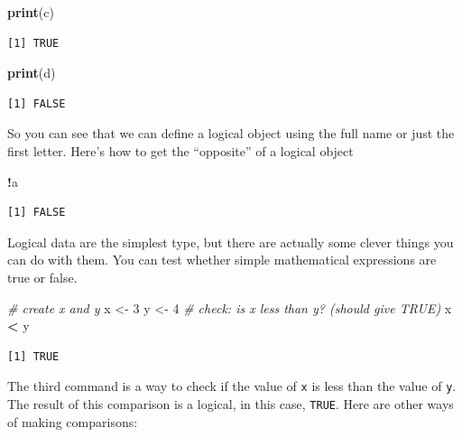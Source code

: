 \documentclass[
]{article}
\newenvironment{Shaded}{\begin{snugshade}}{\end{snugshade}}
\newcommand{\CommentTok}[1]{\textcolor[rgb]{0.56,0.35,0.01}{\textit{#1}}}
\newcommand{\DecValTok}[1]{\textcolor[rgb]{0.00,0.00,0.81}{#1}}
\newcommand{\KeywordTok}[1]{\textcolor[rgb]{0.13,0.29,0.53}{\textbf{#1}}}
\newcommand{\NormalTok}[1]{#1}
\newcommand{\OperatorTok}[1]{\textcolor[rgb]{0.81,0.36,0.00}{\textbf{#1}}}
\newcommand{\StringTok}[1]{\textcolor[rgb]{0.31,0.60,0.02}{#1}}
\begin{document}
\begin{Shaded}
\begin{Highlighting}[]
\KeywordTok{print}\NormalTok{(c)}
\end{Highlighting}
\end{Shaded}

\begin{verbatim}
[1] TRUE
\end{verbatim}

\begin{Shaded}
\begin{Highlighting}[]
\KeywordTok{print}\NormalTok{(d)}
\end{Highlighting}
\end{Shaded}

\begin{verbatim}
[1] FALSE
\end{verbatim}

So you can see that we can define a logical object using the full name or just the first letter.
Here's how to get the ``opposite'' of a logical object

\begin{Shaded}
\begin{Highlighting}[]
\OperatorTok{!}\NormalTok{a}
\end{Highlighting}
\end{Shaded}

\begin{verbatim}
[1] FALSE
\end{verbatim}

Logical data are the simplest type, but there are actually some clever things you can do with them.
You can test whether simple mathematical expressions are true or false.

\begin{Shaded}
\begin{Highlighting}[]
\CommentTok{# create x and y}
\NormalTok{x <-}\StringTok{ }\DecValTok{3}
\NormalTok{y <-}\StringTok{ }\DecValTok{4}
\CommentTok{# check: is x less than y? (should give TRUE)}
\NormalTok{x }\OperatorTok{<}\StringTok{ }\NormalTok{y}
\end{Highlighting}
\end{Shaded}

\begin{verbatim}
[1] TRUE
\end{verbatim}

The third command is a way to check if the value of \texttt{x} is less than the value of \texttt{y}.
The result of this comparison is a logical, in this case, \texttt{TRUE}.
Here are other ways of making comparisons:
\end{document}
